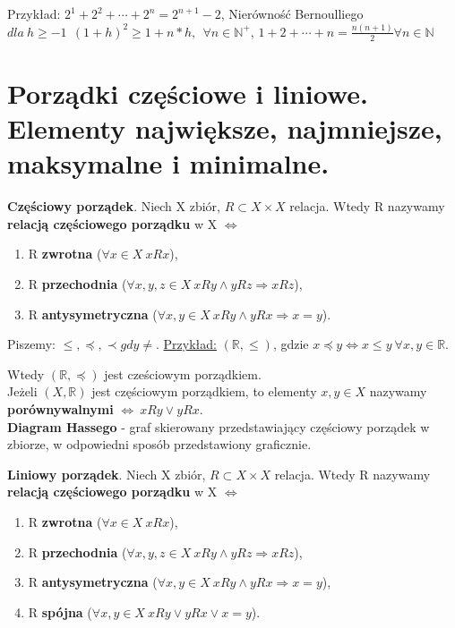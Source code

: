 \documentclass[12pt]{article}
\begin{document}
    Przykład: $2^1 + 2^2 + \cdots + 2^n = 2^{n+1} - 2$, Nierówność Bernoulliego
    $dla ~ h \geq -1 ~~ (1+h)^2 \geq 1 + n*h, ~~ \forall n \in \mathbb{N}^{+}$, $1 + 2 + \cdots + n = \frac{n(n+1)}{2} \forall n \in \mathbb{N}$

    \section{Porządki częściowe i liniowe. Elementy największe, najmniejsze, maksymalne i minimalne.}

    \begin{definition}
        \textbf{Częściowy porządek}. Niech X zbiór, $R \subset X \times X$ relacja. Wtedy R nazywamy \textbf{relacją częściowego porządku} w X
        $\Leftrightarrow$
        \begin{enumerate}
            \item R \textbf{zwrotna} ($\forall x \in X ~ xRx$),
            \item R \textbf{przechodnia} ($\forall x,y,z \in X ~ xRy \wedge yRz \Rightarrow xRz$),
            \item R \textbf{antysymetryczna} ($\forall x,y \in X ~ xRy \wedge yRx \Rightarrow x = y$).
        \end{enumerate}
        Piszemy: $\leqslant, \preceq, \prec gdy \neq$. \underline{Przykład:} $(\mathbb{R}, \leq)$, gdzie $x \preceq y \Leftrightarrow x \leq y ~ \forall x,y \in \mathbb{R}$.

        Wtedy $(\mathbb{R}, \preceq)$ jest cześciowym porządkiem.\\

        Jeżeli $(X, \mathbb{R})$ jest częściowym porządkiem, to elementy $x, y \in X$ nazywamy  \textbf{porównywalnymi}
        $\Leftrightarrow ~ xRy  \vee yRx$.\\

        \textbf{Diagram Hassego} - graf skierowany przedstawiający częściowy porządek w zbiorze, w odpowiedni sposób
        przedstawiony graficznie.
    \end{definition}

    \begin{definition}
        \textbf{Liniowy porządek}. Niech X zbiór, $R \subset X \times X$ relacja. Wtedy R nazywamy \textbf{relacją częściowego porządku} w X
        $\Leftrightarrow$
        \begin{enumerate}
            \item R \textbf{zwrotna} ($\forall x \in X ~ xRx$),
            \item R \textbf{przechodnia} ($\forall x,y,z \in X ~ xRy \wedge yRz \Rightarrow xRz$),
            \item R \textbf{antysymetryczna} ($\forall x,y \in X ~ xRy \wedge yRx \Rightarrow x = y$),
            \item R \textbf{spójna} ($\forall x,y \in X ~ xRy \vee yRx \vee x = y$).
        \end{enumerate}
    \end{definition}
\end{document}
